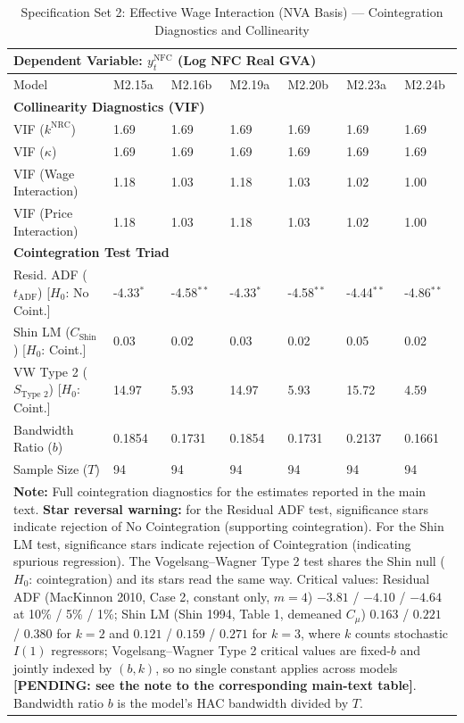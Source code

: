 \begin{table}[H]
\centering
\setlength{\tabcolsep}{2.5pt}
\caption{Specification Set 2: Effective Wage Interaction (NVA Basis) --- Cointegration Diagnostics and Collinearity}
\label{tab:specB_set2_nva_triad}
\scriptsize
\begin{tabular}{p{3.8cm}p{1.1cm}p{1.1cm}p{1.1cm}p{1.1cm}p{1.1cm}p{1.1cm}}
\toprule
\multicolumn{7}{l}{\textbf{Dependent Variable: $y_t^{\text{NFC}}$ (Log NFC Real GVA)}} \\
\midrule
Model & M2.15a & M2.16b & M2.19a & M2.20b & M2.23a & M2.24b \\
\midrule
\multicolumn{7}{l}{\textbf{Collinearity Diagnostics (VIF)}} \\
VIF ($k^{\text{NRC}}$) & 1.69 & 1.69 & 1.69 & 1.69 & 1.69 & 1.69 \\
VIF ($\kappa$) & 1.69 & 1.69 & 1.69 & 1.69 & 1.69 & 1.69 \\
VIF (Wage Interaction) & 1.18 & 1.03 & 1.18 & 1.03 & 1.02 & 1.00 \\
VIF (Price Interaction) & 1.18 & 1.03 & 1.18 & 1.03 & 1.02 & 1.00 \\
\midrule
\multicolumn{7}{l}{\textbf{Cointegration Test Triad}} \\
Resid. ADF ($t_{\text{ADF}}$) [$H_0$: No Coint.] & -4.33$^{*}$ & -4.58$^{**}$ & -4.33$^{*}$ & -4.58$^{**}$ & -4.44$^{**}$ & -4.86$^{**}$ \\
Shin LM ($C_{\text{Shin}}$) [$H_0$: Coint.] & 0.03 & 0.02 & 0.03 & 0.02 & 0.05 & 0.02 \\
VW Type 2 ($S_{\text{Type 2}}$) [$H_0$: Coint.] & 14.97 & 5.93 & 14.97 & 5.93 & 15.72 & 4.59 \\
\midrule
Bandwidth Ratio ($b$) & 0.1854 & 0.1731 & 0.1854 & 0.1731 & 0.2137 & 0.1661 \\
Sample Size ($T$) & 94 & 94 & 94 & 94 & 94 & 94 \\
\bottomrule
\multicolumn{7}{p{15cm}}{\footnotesize \textbf{Note:} Full cointegration diagnostics for the estimates reported in the main text. \textbf{Star reversal warning:} for the Residual ADF test, significance stars indicate rejection of No Cointegration (supporting cointegration). For the Shin LM test, significance stars indicate rejection of Cointegration (indicating spurious regression). The Vogelsang--Wagner Type 2 test shares the Shin null ($H_0$: cointegration) and its stars read the same way. Critical values: Residual ADF (MacKinnon 2010, Case 2, constant only, $m=4$) $-3.81$ / $-4.10$ / $-4.64$ at 10\% / 5\% / 1\%; Shin LM (Shin 1994, Table 1, demeaned $C_\mu$) $0.163$ / $0.221$ / $0.380$ for $k=2$ and $0.121$ / $0.159$ / $0.271$ for $k=3$, where $k$ counts stochastic $I(1)$ regressors; Vogelsang--Wagner Type 2 critical values are fixed-$b$ and jointly indexed by $(b, k)$, so no single constant applies across models \textbf{[PENDING: see the note to the corresponding main-text table]}. Bandwidth ratio $b$ is the model's HAC bandwidth divided by $T$.} \\
\end{tabular}
\end{table}
